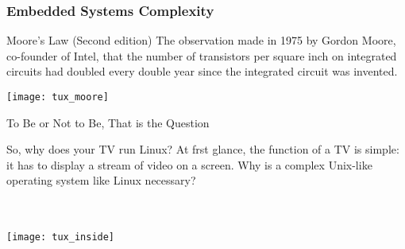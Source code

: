 \begin{frame}
  \frametitle{Embedded Systems Complexity}
  
  \begin{block}{Moore's Law (Second edition)}
    The observation made in 1975 by Gordon Moore, co-founder of Intel, that the number of transistors per square inch on integrated circuits had doubled every double year since the integrated circuit was invented.
  \end{block}
  
      \centering
  \texttt{[image: tux\_moore]}
  
\end{frame}


\begin{frame}{To Be or Not to Be, That is the Question}
    
    \begin{block}{}
    So, why does your TV run Linux? At frst glance, the function of a TV is simple: it has to display a stream of video on a screen. Why is a complex Unix-like operating system like Linux necessary?
    \end{block}
    
    \\
    \\
    
        \centering
  \texttt{[image: tux\_inside]}
    
    
\end{frame}

